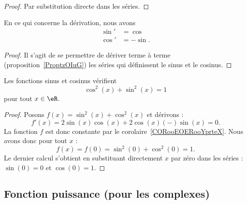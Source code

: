 \begin{proof}
Par substitution directe dans les séries.
\end{proof}

\begin{lemma}       \label{LEMooBBCAooHLWmno}
    En ce qui concerne la dérivation, nous avons
    \begin{subequations}
        \begin{align}
            \sin'&=\cos\\
            \cos'&=-\sin.
        \end{align}
    \end{subequations}
\end{lemma}

\begin{proof}
    Il s'agit de se permettre de dériver terme à terme (proposition~\ref{ProptzOIuG}) les séries qui définissent le sinus et le cosinus.
\end{proof}

\begin{lemma}       \label{LEMooAEFPooGSgOkF}
    Les fonctions sinus et cosinus vérifient
    \begin{equation}        \label{EQooNYCZooApyyRd}
        \cos^2(x)+\sin^2(x)=1
    \end{equation}
    pour tout \( x\in \eR\).
\end{lemma}

\begin{proof}
    Posons \( f(x)=\sin^2(x)+\cos^2(x)\) et dérivons :
    \begin{equation}
        f'(x)=2\sin(x)\cos(x)+2\cos(x)(-)\sin(x)=0.
    \end{equation}
    La fonction \( f\) est donc constante par le corolaire~\ref{CORooEOERooYprteX}. Nous avons donc pour tout \( x\) :
    \begin{equation}
        f(x)=f(0)=\sin^2(0)+\cos^2(0)=1.
    \end{equation}
    Le dernier calcul s'obtient en substituant directement \( x\) par zéro dans les séries : \( \sin(0)=0\) et \( \cos(0)=1\).
\end{proof}

\subsection{Fonction puissance (pour les complexes)}

